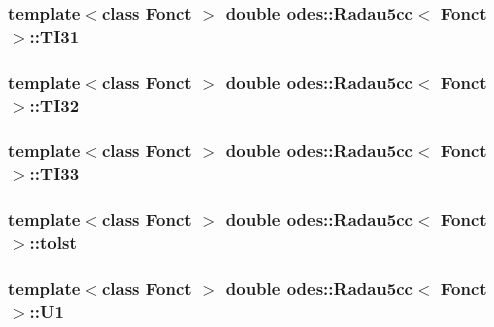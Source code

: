 \hypertarget{classodes_1_1Radau5cc_a0b21d463e63aaa3ae216def4605ed64a}{
\subsubsection[{T\-I31}]{\setlength{\rightskip}{0pt plus 5cm}template$<$class Fonct $>$ double {\bf odes\-::\-Radau5cc}$<$ Fonct $>$\-::T\-I31\hspace{0.3cm}{\ttfamily [private]}}}\label{classodes_1_1Radau5cc_a0b21d463e63aaa3ae216def4605ed64a}
\hypertarget{classodes_1_1Radau5cc_a6707fd7852c5536fcdc9a85cb78cef5c}{
\subsubsection[{T\-I32}]{\setlength{\rightskip}{0pt plus 5cm}template$<$class Fonct $>$ double {\bf odes\-::\-Radau5cc}$<$ Fonct $>$\-::T\-I32\hspace{0.3cm}{\ttfamily [private]}}}\label{classodes_1_1Radau5cc_a6707fd7852c5536fcdc9a85cb78cef5c}
\hypertarget{classodes_1_1Radau5cc_a6641ca56a3e50256303f70f839365c93}{
\subsubsection[{T\-I33}]{\setlength{\rightskip}{0pt plus 5cm}template$<$class Fonct $>$ double {\bf odes\-::\-Radau5cc}$<$ Fonct $>$\-::T\-I33\hspace{0.3cm}{\ttfamily [private]}}}\label{classodes_1_1Radau5cc_a6641ca56a3e50256303f70f839365c93}
\hypertarget{classodes_1_1Radau5cc_abdf9186a294f8720b8d5100335b6e39a}{
\subsubsection[{tolst}]{\setlength{\rightskip}{0pt plus 5cm}template$<$class Fonct $>$ double {\bf odes\-::\-Radau5cc}$<$ Fonct $>$\-::tolst\hspace{0.3cm}{\ttfamily [private]}}}\label{classodes_1_1Radau5cc_abdf9186a294f8720b8d5100335b6e39a}
\hypertarget{classodes_1_1Radau5cc_ae23acdd71ce8640aa40e111b4df06922}{
\subsubsection[{U1}]{\setlength{\rightskip}{0pt plus 5cm}template$<$class Fonct $>$ double {\bf odes\-::\-Radau5cc}$<$ Fonct $>$\-::U1\hspace{0.3cm}{\ttfamily [private]}}}\label{classodes_1_1Radau5cc_ae23acdd71ce8640aa40e111b4df06922}
